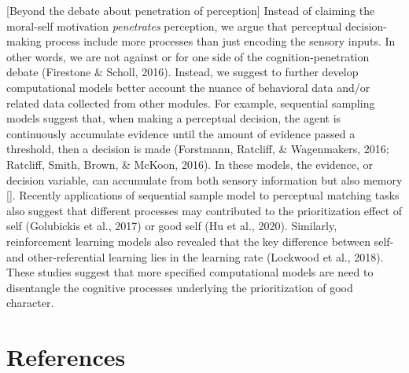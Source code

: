\documentclass[
  man]{apa6}
\begin{document}
{[}Beyond the debate about penetration of perception{]}
Instead of claiming the moral-self motivation \emph{penetrates} perception, we argue that perceptual decision-making process include more processes than just encoding the sensory inputs. In other words, we are not against or for one side of the cognition-penetration debate (Firestone \& Scholl, 2016). Instead, we suggest to further develop computational models better account the nuance of behavioral data and/or related data collected from other modules. For example, sequential sampling models suggest that, when making a perceptual decision, the agent is continuously accumulate evidence until the amount of evidence passed a threshold, then a decision is made (Forstmann, Ratcliff, \& Wagenmakers, 2016; Ratcliff, Smith, Brown, \& McKoon, 2016). In these models, the evidence, or decision variable, can accumulate from both sensory information but also memory {[}{]}. Recently applications of sequential sample model to perceptual matching tasks also suggest that different processes may contributed to the prioritization effect of self (Golubickis et al., 2017) or good self (Hu et al., 2020). Similarly, reinforcement learning models also revealed that the key difference between self- and other-referential learning lies in the learning rate (Lockwood et al., 2018). These studies suggest that more specified computational models are need to disentangle the cognitive processes underlying the prioritization of good character.

\hypertarget{references}{%
\section{References}\label{references}}

\begingroup
\setlength{\parindent}{-0.5in}
\setlength{\leftskip}{0.5in}
\end{document}
